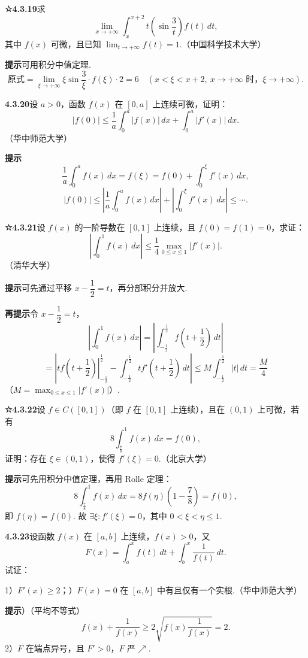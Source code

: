 \documentclass[UTF8, 12pt, fontset=fandol, oneside]{ctexart}
\begin{document}
\noindent\textbf{☆4.3.19}\quad 求
\[
\lim_{x\to+\infty}\int_x^{x+2}t\left(\sin\frac3t\right)f(t)\,dt,
\]
其中 $f(x)$ 可微，且已知 $\displaystyle\lim_{t\to+\infty}f(t)=1$.（中国科学技术大学）

\noindent\textbf{提示}\quad 可用积分中值定理.
\[
\text{原式}=\lim_{\xi\to+\infty}\xi\sin\frac3\xi\cdot f(\xi)\cdot2=6
\quad(x<\xi<x+2,\ x\to+\infty\text{ 时，}\xi\to+\infty).
\]

\noindent\textbf{4.3.20}\quad 设 $a>0$，函数 $f(x)$ 在 $[0,a]$ 上连续可微，证明：
\[
|f(0)|\le\frac1a\int_0^a|f(x)|\,dx+\int_0^a|f'(x)|\,dx.
\]
（华中师范大学）

\noindent\textbf{提示}\quad
\[
\frac1a\int_0^a f(x)\,dx=f(\xi)=f(0)+\int_0^\xi f'(x)\,dx,
\]
\[
|f(0)|\le\left|\frac1a\int_0^a f(x)\,dx\right|
+\left|\int_0^\xi f'(x)\,dx\right|\le\cdots.
\]

\noindent\textbf{☆4.3.21}\quad 设 $f(x)$ 的一阶导数在 $[0,1]$ 上连续，且 $f(0)=f(1)=0$，求证：
\[
\left|\int_0^1 f(x)\,dx\right|
\le\frac14\max_{0\le x\le1}|f'(x)|.
\]
（清华大学）

\noindent\textbf{提示}\quad 可先通过平移 $x-\dfrac12=t$，再分部积分并放大.

\noindent\textbf{再提示}\quad 令 $x-\dfrac12=t$，
\[
\left|\int_0^1f(x)\,dx\right|
=\left|\int_{-\frac12}^{\frac12}f\left(t+\frac12\right)\,dt\right|
\]
\[
=\left|\left.tf\left(t+\frac12\right)\right|_{-\frac12}^{\frac12}
-\int_{-\frac12}^{\frac12}tf'\left(t+\frac12\right)\,dt\right|
\le M\int_{-\frac12}^{\frac12}|t|\,dt=\frac M4
\]
（$M=\displaystyle\max_{0\le x\le1}|f'(x)|$）.

\noindent\textbf{☆4.3.22}\quad 设 $f\in C([0,1])$（即 $f$ 在 $[0,1]$ 上连续），且在 $(0,1)$ 上可微，若有
\[
8\int_{\frac78}^1f(x)\,dx=f(0),
\]
证明：存在 $\xi\in(0,1)$，使得 $f'(\xi)=0$.（北京大学）

\noindent\textbf{提示}\quad 可先用积分中值定理，再用 Rolle 定理：
\[
8\int_{\frac78}^1f(x)\,dx=8f(\eta)\left(1-\frac78\right)=f(0),
\]
即 $f(\eta)=f(0)$. 故 $\exists\xi:f'(\xi)=0$，其中 $0<\xi<\eta\le1$.

\noindent\textbf{4.3.23}\quad 设函数 $f(x)$ 在 $[a,b]$ 上连续，$f(x)>0$，又
\[
F(x)=\int_a^x f(t)\,dt+\int_b^x\frac1{f(t)}\,dt.
\]
试证：

1）$F'(x)\ge2$；）$F(x)=0$ 在 $[a,b]$ 中有且仅有一个实根.（华中师范大学）

\noindent\textbf{提示}）（平均不等式）
\[
f(x)+\frac1{f(x)}\ge2\sqrt{f(x)\frac1{f(x)}}=2.
\]
2）$F$ 在端点异号，且 $F'>0$，$F$ 严$\nearrow$.
\end{document}
